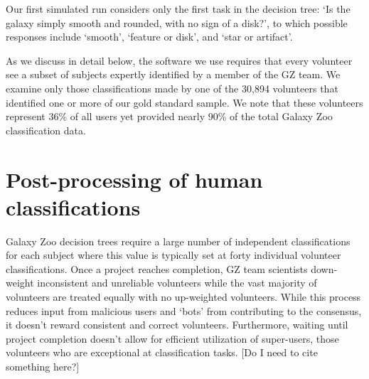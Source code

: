 \documentclass[twocolumn]{aastex6}
\begin{document}


Our first simulated run considers only the first task in the decision tree: 
`Is the galaxy simply smooth and rounded, with no sign of a disk?', to which possible 
responses include `smooth', `feature or disk', and `star or artifact'.  

As we discuss in detail below, the software we use requires that every volunteer see a
subset of subjects expertly identified by a member of the GZ team. We examine only those
classifications made by one of the  30,894 volunteers that identified one or more of
our gold standard sample. We note that these volunteers represent 36\% of all users 
yet provided nearly 90\% of the total Galaxy Zoo classification data. 



\section{Post-processing of human classifications}

Galaxy Zoo decision trees require a large 
number of independent classifications for each subject where this value is typically 
set at forty individual volunteer classifications. Once a project reaches completion, 
GZ team scientists down-weight inconsistent and unreliable 
volunteers while the vast majority of volunteers are treated equally with no up-weighted volunteers.
While this process reduces input from malicious users and `bots' from contributing to the consensus, 
it doesn't reward consistent and correct volunteers. Furthermore, waiting until project completion 
doesn't allow for efficient utilization of super-users, those volunteers who are exceptional at 
classification tasks. [Do I need to cite something here?]
\end{document}
